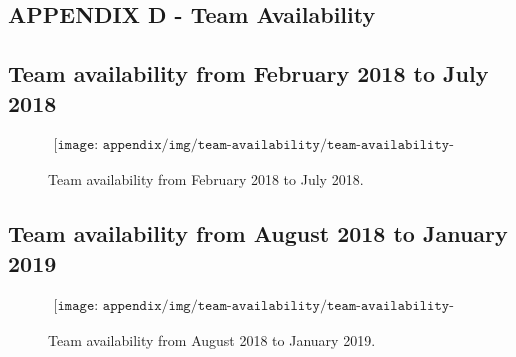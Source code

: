 \begin{landscape}
\section{APPENDIX D - Team Availability} \label{sec:appD}

\subsection{Team availability from February 2018 to July 2018}

\begin{figure}[H]
    \begin{align*}
        \texttt{[image: appendix/img/team-availability/team-availability-feb18-jul18.png]}
    \end{align*}
    \caption{Team availability from February 2018 to July 2018.}
    \label{fig:team-availability-feb18-jul18}
\end{figure}

\end{landscape}

\pagebreak

\begin{landscape}

\subsection{Team availability from August 2018 to January 2019}

\begin{figure}[H]
    \begin{align*}
        \texttt{[image: appendix/img/team-availability/team-availability-aug18-jan19.png]}
    \end{align*}
    \caption{Team availability from August 2018 to January 2019.}
    \label{fig:team-availability-aug18-jan19}
\end{figure}

\end{landscape}